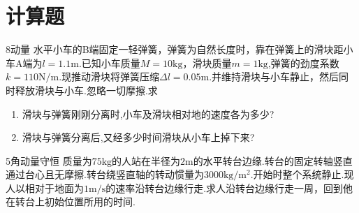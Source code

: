 \section{计算题}
\hspace{-2.16em}
\begin{minipage}{0.67\textwidth}
    \begin{exercise}{8}{动量}
        水平小车的B端固定一轻弹簧，弹簧为自然长度时，靠在弹簧上的滑块距小车A端为$l=1.1\mathrm{m}$.已知小车质量$M=10\mathrm{kg}$，滑块质量$m=1\mathrm{kg}$,弹簧的劲度系数$k=110\mathrm{N/m}$.现推动滑块将弹簧压缩$\Delta l=0.05\mathrm{m}$.并维持滑块与小车静止，然后同时释放滑块与小车.忽略一切摩擦.求
        \begin{enumerate}
            \item 滑块与弹簧刚刚分离时,小车及滑块相对地的速度各为多少?
            \item 滑块与弹簧分离后,又经多少时间滑块从小车上掉下来?
        \end{enumerate}
    \end{exercise}
\end{minipage}
\hfill
\begin{minipage}[c]{0.33\textwidth}
\begin{center}
    \begin{tikzpicture}
    
    \end{tikzpicture}
\end{center}
\end{minipage}

\begin{exercise}{5}{角动量守恒}
    质量为$75\mathrm{kg}$的人站在半径为$2\mathrm{m}$的水平转台边缘.转台的固定转轴竖直通过台心且无摩擦.转台绕竖直轴的转动惯量为$3000\mathrm{kg/m^2}$.开始时整个系统静止.现人以相对于地面为$1\mathrm{m/s}$的速率沿转台边缘行走.求人沿转台边缘行走一周，回到他在转台上初始位置所用的时间.
\end{exercise}

